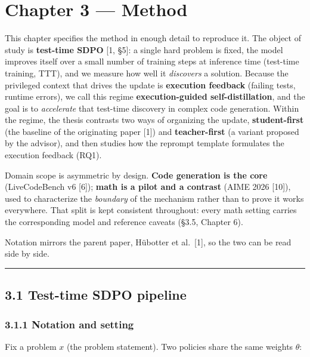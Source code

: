 \chapter{Chapter 3 --- Method}\label{chapter-3-method}

This chapter specifies the method in enough detail to reproduce it. The object of study is \textbf{test-time SDPO} {[}1, §5{]}: a single hard problem is fixed, the model improves itself over a small number of training steps at inference time (test-time training, TTT), and we measure how well it \emph{discovers} a solution. Because the privileged context that drives the update is \textbf{execution feedback} (failing tests, runtime errors), we call this regime \textbf{execution-guided self-distillation}, and the goal is to \emph{accelerate} that test-time discovery in complex code generation. Within the regime, the thesis contrasts two ways of organizing the update, \textbf{student-first} (the baseline of the originating paper {[}1{]}) and \textbf{teacher-first} (a variant proposed by the advisor), and then studies how the reprompt template formulates the execution feedback (RQ1).

Domain scope is asymmetric by design. \textbf{Code generation is the core} (LiveCodeBench v6 {[}6{]}); \textbf{math is a pilot and a contrast} (AIME 2026 {[}10{]}), used to characterize the \emph{boundary} of the mechanism rather than to prove it works everywhere. That split is kept consistent throughout: every math setting carries the corresponding model and reference caveats (§3.5, Chapter 6).

Notation mirrors the parent paper, Hübotter et al.~{[}1{]}, so the two can be read side by side.

\begin{center}\rule{0.5\linewidth}{0.5pt}\end{center}

\section{3.1 Test-time SDPO pipeline}\label{test-time-sdpo-pipeline}

\subsection{3.1.1 Notation and setting}\label{notation-and-setting}

Fix a problem \(x\) (the problem statement). Two policies share the same weights \(\theta\):

